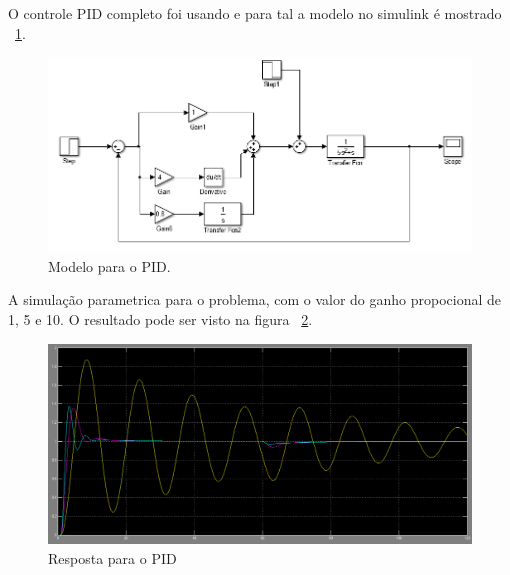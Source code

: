 \documentclass[a4paper, 10pt]{article}
\begin{document}
O controle PID completo foi usando e para tal a modelo no simulink é mostrado ~\ref{fig:modProb5}.

\begin{figure}[!ht]
	\centering
	\includegraphics[scale=.5]{mq5.png}
    \caption{Modelo para o PID.}
    \label{fig:modProb5}
\end{figure}

A simulação parametrica para o problema, com o valor do ganho
propocional de 1, 5 e 10. O resultado pode ser visto na figura ~\ref{fig:resProb5}. 

\begin{figure}[!ht]
	\centering
	\includegraphics[scale=.3]{rq5.png}
    \caption{Resposta para o PID}
    \label{fig:resProb5}
\end{figure}
\end{document}
